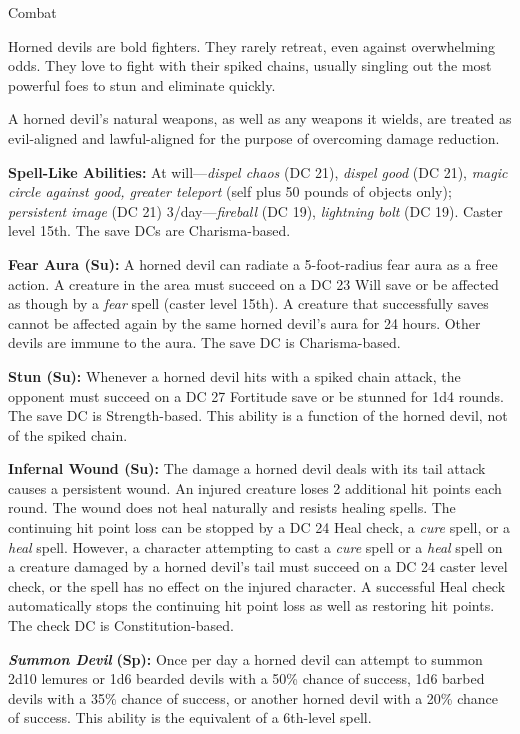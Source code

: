 \documentclass{article}
\begin{document}
Combat

Horned devils are bold fighters. They rarely retreat, even against overwhelming 
odds. They love to fight with their spiked chains, usually singling out the most 
powerful foes to stun and eliminate quickly.

A horned devil's natural weapons, as well as any weapons it wields, are treated 
as evil-aligned and lawful-aligned for the purpose of overcoming damage reduction.

\textbf{Spell-Like Abilities:} At will---\textit{dispel chaos }(DC 21), \textit{dispel 
good }(DC 21), \textit{magic circle against good, greater teleport }(self plus 
50 pounds of objects only); \textit{persistent image }(DC 21) 3/day---\textit{fireball 
}(DC 19), \textit{lightning bolt }(DC 19). Caster level 15th. The save DCs are 
Charisma-based.

\textbf{Fear Aura (Su): }A horned devil can radiate a 5-foot-radius fear aura as 
a free action. A creature in the area must succeed on a DC 23 Will save or be affected 
as though by a \textit{fear }spell (caster level 15th). A creature that successfully 
saves cannot be affected again by the same horned devil's aura for 24 hours. Other 
devils are immune to the aura. The save DC is Charisma-based.

\textbf{Stun (Su):} Whenever a horned devil hits with a spiked chain attack, the 
opponent must succeed on a DC 27 Fortitude save or be stunned for 1d4 rounds. The 
save DC is Strength-based. This ability is a function of the horned devil, not 
of the spiked chain.

\textbf{Infernal Wound (Su):} The damage a horned devil deals with its tail attack 
causes a persistent wound. An injured creature loses 2 additional hit points each 
round. The wound does not heal naturally and resists healing spells. The continuing 
hit point loss can be stopped by a DC 24 Heal check, a \textit{cure }spell, or 
a \textit{heal }spell. However, a character attempting to cast a \textit{cure }spell 
or a \textit{heal }spell on a creature damaged by a horned devil's tail must succeed 
on a DC 24 caster level check, or the spell has no effect on the injured character. 
A successful Heal check automatically stops the continuing hit point loss as well 
as restoring hit points. The check DC is Constitution-based.

\textit{\textbf{Summon Devil }}\textbf{(Sp):} Once per day a horned devil can attempt 
to summon 2d10 lemures or 1d6 bearded devils with a 50\% chance of success, 1d6 
barbed devils with a 35\% chance of success, or another horned devil with a 20\% 
chance of success. This ability is the equivalent of a 6th-level spell.
\end{document}
